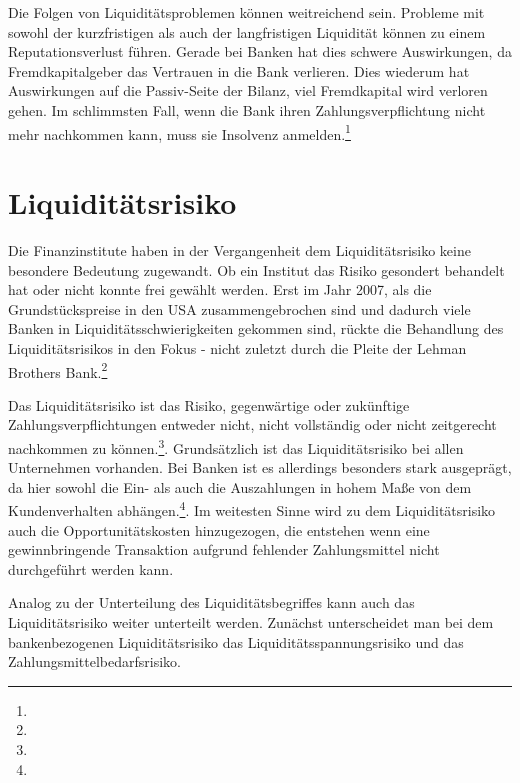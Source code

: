 Die Folgen von Liquiditätsproblemen können weitreichend sein. Probleme mit sowohl der kurzfristigen als auch der langfristigen Liquidität können zu einem Reputationsverlust führen. Gerade bei Banken hat dies schwere Auswirkungen, da Fremdkapitalgeber das Vertrauen in die Bank verlieren. Dies wiederum hat Auswirkungen auf die Passiv-Seite der Bilanz, viel Fremdkapital wird verloren gehen. Im schlimmsten Fall, wenn die Bank ihren Zahlungsverpflichtung nicht mehr nachkommen kann, muss sie Insolvenz anmelden.\footnote{ }

\section{Liquiditätsrisiko}
Die Finanzinstitute haben in der Vergangenheit dem Liquiditätsrisiko keine besondere Bedeutung zugewandt. Ob ein Institut das Risiko gesondert behandelt hat oder nicht konnte frei gewählt werden. Erst im Jahr 2007, als die Grundstückspreise in den USA zusammengebrochen sind und dadurch viele Banken in Liquiditätsschwierigkeiten gekommen sind, rückte die Behandlung des Liquiditätsrisikos in den Fokus - nicht zuletzt durch die Pleite der Lehman Brothers Bank.\footnote{ }


Das Liquiditätsrisiko ist das Risiko, gegenwärtige oder zukünftige Zahlungsverpflichtungen entweder nicht, nicht vollständig oder nicht zeitgerecht nachkommen zu können.\footnote{  }. Grundsätzlich ist das Liquiditätsrisiko bei allen Unternehmen vorhanden. Bei Banken ist es allerdings besonders stark ausgeprägt, da hier sowohl die Ein- als auch die Auszahlungen in hohem Maße von dem Kundenverhalten abhängen.\footnote{ }. Im weitesten Sinne wird zu dem Liquiditätsrisiko auch die Opportunitätskosten hinzugezogen, die entstehen wenn eine gewinnbringende Transaktion aufgrund fehlender Zahlungsmittel nicht durchgeführt werden kann.

Analog zu der Unterteilung des Liquiditätsbegriffes kann auch das Liquiditätsrisiko weiter unterteilt werden. Zunächst unterscheidet man bei dem bankenbezogenen Liquiditätsrisiko das Liquiditätsspannungsrisiko und das Zahlungsmittelbedarfsrisiko.


